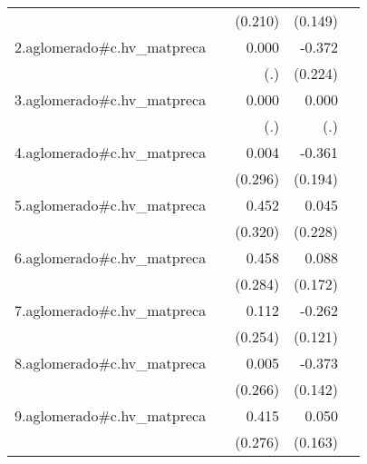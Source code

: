 {\begin{longtable}{l*{4}{D{.}{.}{-1}}}
            &                     &     (0.210)         &     (0.149)         &                     \\
\addlinespace
2.aglomerado#c.hv\_matpreca&                     &       0.000         &      -0.372         &                     \\
            &                     &         (.)         &     (0.224)         &                     \\
\addlinespace
3.aglomerado#c.hv\_matpreca&                     &       0.000         &       0.000         &                     \\
            &                     &         (.)         &         (.)         &                     \\
\addlinespace
4.aglomerado#c.hv\_matpreca&                     &       0.004         &      -0.361         &                     \\
            &                     &     (0.296)         &     (0.194)         &                     \\
\addlinespace
5.aglomerado#c.hv\_matpreca&                     &       0.452         &       0.045         &                     \\
            &                     &     (0.320)         &     (0.228)         &                     \\
\addlinespace
6.aglomerado#c.hv\_matpreca&                     &       0.458         &       0.088         &                     \\
            &                     &     (0.284)         &     (0.172)         &                     \\
\addlinespace
7.aglomerado#c.hv\_matpreca&                     &       0.112         &      -0.262\sym{*}  &                     \\
            &                     &     (0.254)         &     (0.121)         &                     \\
\addlinespace
8.aglomerado#c.hv\_matpreca&                     &       0.005         &      -0.373\sym{**} &                     \\
            &                     &     (0.266)         &     (0.142)         &                     \\
\addlinespace
9.aglomerado#c.hv\_matpreca&                     &       0.415         &       0.050         &                     \\
            &                     &     (0.276)         &     (0.163)         &                     \\

\end{longtable}}
